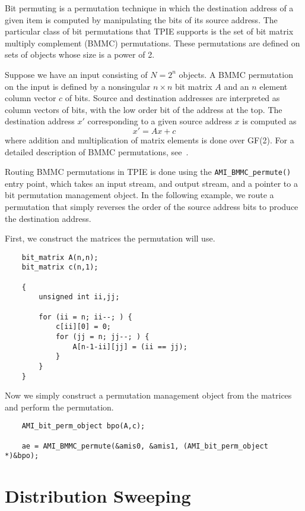 
Bit permuting is a permutation technique in which the destination address
of a given item is computed by manipulating the bits of its source address.
The particular class of bit permutations that TPIE supports is the set of
bit matrix multiply complement (BMMC) permutations.  These permutations are
defined on sets of objects whose size is a power of 2.

Suppose we have an input consisting of $N = 2^n$ objects.  A BMMC
permutation on the input is defined by a nonsingular $n \times n$ bit
matrix $A$ and an $n$ element column vector $c$ of bits.  Source and
destination addresses are interpreted as column vectors of bits, with
the low order bit of the address at the top. The destination address
$x'$ corresponding to a given source address $x$ is computed as
$$x' = Ax + c$$ where addition and multiplication of matrix elements is
done over GF(2). For a detailed description of BMMC permutations,
see~\cite{cormen:integrate-tr}.

Routing BMMC permutations in TPIE is done using the
\verb|AMI_BMMC_permute()| entry point, which takes an input stream, and output stream, and a
pointer to a bit permutation management object. In the following example,
we route a permutation that simply reverses the order of the source address
bits to produce the destination address.

First, we construct the matrices the permutation will use.
\begin{verbatim}
    bit_matrix A(n,n);
    bit_matrix c(n,1);

    {
        unsigned int ii,jj;

        for (ii = n; ii--; ) {
            c[ii][0] = 0;
            for (jj = n; jj--; ) {
                A[n-1-ii][jj] = (ii == jj);
            }
        }
    }
\end{verbatim}
Now we simply construct a permutation management object from the
matrices and perform the permutation.
\begin{verbatim}
    AMI_bit_perm_object bpo(A,c);
    
    ae = AMI_BMMC_permute(&amis0, &amis1, (AMI_bit_perm_object *)&bpo);
\end{verbatim}

\section{Distribution Sweeping} \label{sec:distsweep}

